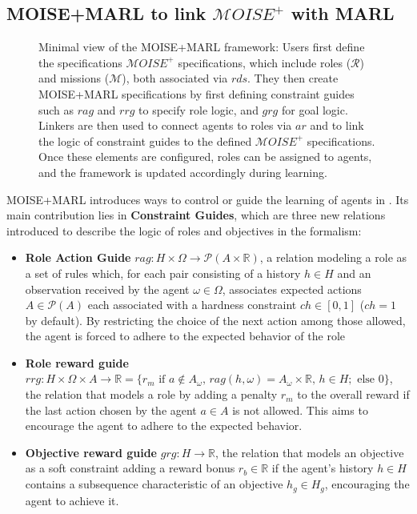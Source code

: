 \subsection{MOISE+MARL to link $\mathcal{M} OISE^+$ with MARL}

\begin{figure}[h!]
\centering

\caption[Minimal view of the MOISE+MARL framework]{Minimal view of the MOISE+MARL framework: Users first define the specifications $\mathcal{M} OISE^+$ specifications, which include roles ($\mathcal{R}$) and missions ($\mathcal{M}$), both associated via $rds$. They then create MOISE+MARL specifications by first defining constraint guides such as $rag$ and $rrg$ to specify role logic, and $grg$ for goal logic. Linkers are then used to connect agents to roles via $ar$ and to link the logic of constraint guides to the defined $\mathcal{M}OISE^+$ specifications. Once these elements are configured, roles can be assigned to agents, and the  framework is updated accordingly during learning.
}
\label{fig:mm_synthesis}
\end {figure}

\noindent MOISE+MARL introduces ways to control or guide the learning of agents in . Its main contribution lies in \textbf{Constraint Guides}, which are three new relations introduced to describe the logic of roles and objectives in the  formalism:
%
\begin{itemize}

  \item \textbf{Role Action Guide} \quad $rag: H \times \Omega \rightarrow \mathcal{P}(A \times \mathbb{R})$, a relation modeling a role as a set of rules which, for each pair consisting of a history $h \in H$ and an observation received by the agent $\omega \in \Omega$, associates expected actions $A \in \mathcal {P}(A)$ each associated with a hardness constraint $ch \in [0,1]$ ($ch = 1$ by default). By restricting the choice of the next action among those allowed, the agent is forced to adhere to the expected behavior of the role
  \item \textbf{Role reward guide} \quad $rrg: H \times \Omega \times A \to \mathbb{R} = \{r_m \text{ if } a \notin A_\omega \text{, } rag(h, \omega) \allowbreak = \allowbreak A_\omega \times \mathbb{R} \text{, } h \in H; \text{ else } 0\}$, the relation that models a role by adding a penalty $r_m$ to the overall reward if the last action chosen by the agent $a \in A$ is not allowed. This aims to encourage the agent to adhere to the expected behavior.
  \item \textbf{Objective reward guide} \quad $grg: H \rightarrow \mathbb{R}$, the relation that models an objective as a soft constraint adding a reward bonus $r_b \in \mathbb{R}$ if the agent's history $h \in H$ contains a subsequence characteristic of an objective $h_g \in H_g$, encouraging the agent to achieve it.
\end{itemize}


